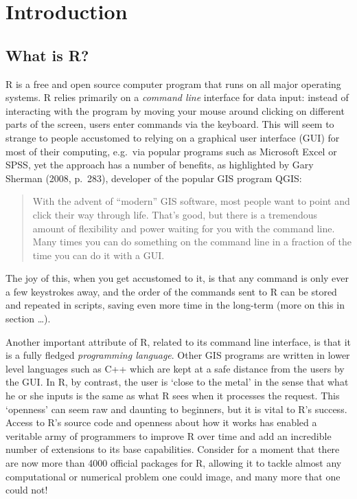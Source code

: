 \documentclass[]{article}
\author{}
\date{}
\begin{document}
\section{Introduction}

\subsection{What is R?}

R is a free and open source computer program that runs on all major
operating systems. R relies primarily on a \emph{command line} interface
for data input: instead of interacting with the program by moving your
mouse around clicking on different parts of the screen, users enter
commands via the keyboard. This will seem to strange to people
accustomed to relying on a graphical user interface (GUI) for most of
their computing, e.g.~via popular programs such as Microsoft Excel or
SPSS, yet the approach has a number of benefits, as highlighted by Gary
Sherman (2008, p.~283), developer of the popular GIS program QGIS:

\begin{quote}
With the advent of ``modern'' GIS software, most people want to point
and click their way through life. That's good, but there is a tremendous
amount of flexibility and power waiting for you with the command line.
Many times you can do something on the command line in a fraction of the
time you can do it with a GUI.
\end{quote}

The joy of this, when you get accustomed to it, is that any command is
only ever a few keystrokes away, and the order of the commands sent to R
can be stored and repeated in scripts, saving even more time in the
long-term (more on this in section \ldots{}).

Another important attribute of R, related to its command line interface,
is that it is a fully fledged \emph{programming language}. Other GIS
programs are written in lower level languages such as C++ which are kept
at a safe distance from the users by the GUI. In R, by contrast, the
user is `close to the metal' in the sense that what he or she inputs is
the same as what R sees when it processes the request. This `openness'
can seem raw and daunting to beginners, but it is vital to R's success.
Access to R's source code and openness about how it works has enabled a
veritable army of programmers to improve R over time and add an
incredible number of extensions to its base capabilities. Consider for a
moment that there are now more than 4000 official packages for R,
allowing it to tackle almost any computational or numerical problem one
could image, and many more that one could not!
\end{document}
